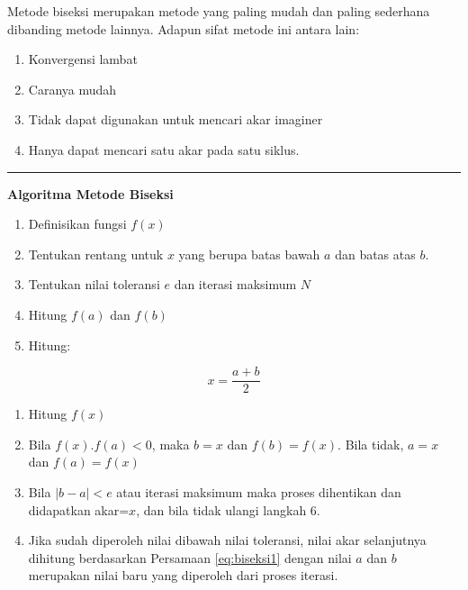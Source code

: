 \documentclass[]{book}
\providecommand{\tightlist}{%
  \setlength{\itemsep}{0pt}\setlength{\parskip}{0pt}}
\theoremstyle{definition}
\theoremstyle{definition}
\theoremstyle{definition}
\theoremstyle{remark}
\begin{document}
Metode biseksi merupakan metode yang paling mudah dan paling sederhana dibanding metode lainnya. Adapun sifat metode ini antara lain:

\begin{enumerate}
\def\labelenumi{\arabic{enumi}.}
\tightlist
\item
  Konvergensi lambat
\item
  Caranya mudah
\item
  Tidak dapat digunakan untuk mencari akar imaginer
\item
  Hanya dapat mencari satu akar pada satu siklus.
\end{enumerate}

\begin{center}\rule{0.5\linewidth}{\linethickness}\end{center}

\textbf{Algoritma Metode Biseksi}

\begin{enumerate}
\def\labelenumi{\arabic{enumi}.}
\tightlist
\item
  Definisikan fungsi \(f\left(x \right)\)
\item
  Tentukan rentang untuk \(x\) yang berupa batas bawah \(a\) dan batas atas \(b\).
\item
  Tentukan nilai toleransi \(e\) dan iterasi maksimum \(N\)
\item
  Hitung \(f\left(a \right)\) dan \(f\left(b \right)\)
\item
  Hitung:
\end{enumerate}

\begin{equation}
x=\frac{a+b}{2}
  \label{eq:biseksi1}
\end{equation}

\begin{enumerate}
\def\labelenumi{\arabic{enumi}.}
\setcounter{enumi}{5}
\tightlist
\item
  Hitung \(f\left(x \right)\)
\item
  Bila \(f\left(x \right).f\left(a \right)<0\), maka \(b=x\) dan \(f\left(b \right)=f\left(x \right)\). Bila tidak, \(a=x\) dan \(f\left(a \right)=f\left(x \right)\)
\item
  Bila \(\left|b-a \right|<e\) atau iterasi maksimum maka proses dihentikan dan didapatkan akar=\(x\), dan bila tidak ulangi langkah 6.
\item
  Jika sudah diperoleh nilai dibawah nilai toleransi, nilai akar selanjutnya dihitung berdasarkan Persamaan \eqref{eq:biseksi1} dengan nilai \(a\) dan \(b\) merupakan nilai baru yang diperoleh dari proses iterasi.
\end{enumerate}
\end{document}
